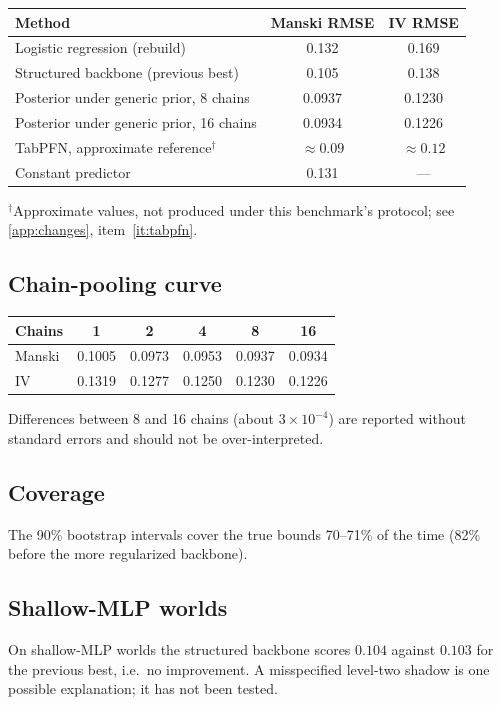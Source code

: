 \documentclass[11pt]{article}
\theoremstyle{definition}
\theoremstyle{remark}
\begin{document}
\begin{center}
\begin{tabular}{@{}lcc@{}}
\toprule
Method & Manski RMSE & IV RMSE\\
\midrule
Logistic regression (rebuild) & 0.132 & 0.169\\
Structured backbone (previous best) & 0.105 & 0.138\\
Posterior under generic prior, 8 chains & 0.0937 & 0.1230\\
Posterior under generic prior, 16 chains & 0.0934 & 0.1226\\
TabPFN, approximate reference$^{\dagger}$ & $\approx0.09$ & $\approx0.12$\\
Constant predictor & 0.131 & ---\\
\bottomrule
\end{tabular}
\end{center}
{\small $^\dagger$Approximate values, not produced under this benchmark's protocol; see
\cref{app:changes}, item~\ref{it:tabpfn}.}

\subsection{Chain-pooling curve}
\begin{center}
\begin{tabular}{@{}lccccc@{}}
\toprule
Chains & 1 & 2 & 4 & 8 & 16\\
\midrule
Manski & 0.1005 & 0.0973 & 0.0953 & 0.0937 & 0.0934\\
IV & 0.1319 & 0.1277 & 0.1250 & 0.1230 & 0.1226\\
\bottomrule
\end{tabular}
\end{center}
Differences between 8 and 16 chains (about $3\times10^{-4}$) are reported without standard errors and
should not be over-interpreted.

\subsection{Coverage}
The 90\% bootstrap intervals cover the true bounds 70--71\% of the time (82\% before the more
regularized backbone).

\subsection{Shallow-MLP worlds}
On shallow-MLP worlds the structured backbone scores $0.104$ against $0.103$ for the previous best,
i.e.\ no improvement. A misspecified level-two shadow is one possible explanation; it has not been
tested.
\end{document}
